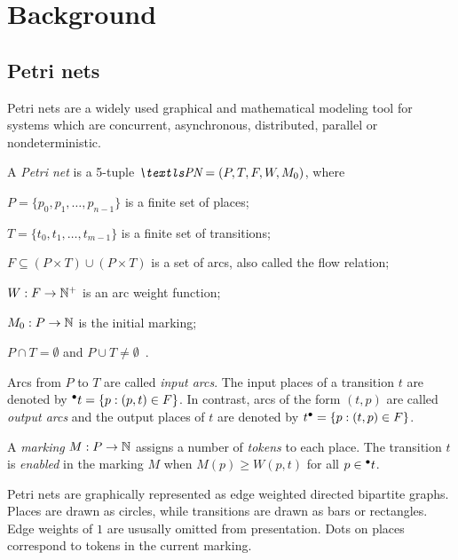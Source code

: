 \chapter{Background}
\label{chap:background}

\section{Petri nets}

Petri nets are a widely used graphical and mathematical modeling tool
for systems which are concurrent, asynchronous, distributed, parallel
or nondeterministic.

\begin{dfn}
  A \emph{Petri net} is a 5-tuple $\PN = (P, T, F, W, M_0)$, where
  \begin{asparaitem}
  \item $P = \{p_0, p_1, \ldots, p_{n - 1}\}$ is a finite set of places;
  \item $T = \{t_0, t_1, \ldots, t_{m - 1}\}$ is a finite set of transitions;
  \item $F \subseteq (P \times T) \cup (P \times T)$ is a set of
    arcs, also called the flow relation;
  \item $W: F \to \mathbb{N}^{+}$ is an arc weight function;
  \item $M_0: P \to \mathbb{N}$ is the initial marking;
  \item $P \cap T = \emptyset$ and $P \cup T \neq
    \emptyset$~\citep{murata1989petri}.
  \end{asparaitem}
\end{dfn}

Arcs from $P$ to $T$ are called \emph{input arcs}. The input places of
a transition $t$ are denoted by $\prescript{\bullet}{}{t} = \{ p : (p, t) \in F
\}$.
In contrast, arcs of the form $(t, p)$ are called \emph{output arcs}
and the output places of $t$ are denoted by
$t^\bullet = \{p : (t, p) \in F \}$.

A \emph{marking} $M: P \to \mathbb{N}$ assigns a number of \emph{tokens} to each
place. The transition $t$ is \emph{enabled} in the marking $M$
 when $M(p) \ge W(p, t)$ for all $p \in
\prescript{\bullet}{}{t}$.

Petri nets are graphically represented as edge weighted directed
bipartite graphs. Places are drawn as circles, while transitions are
drawn as bars or rectangles. Edge weights of $1$ are ususally omitted
from presentation. Dots on places correspond to tokens in the current
marking.

